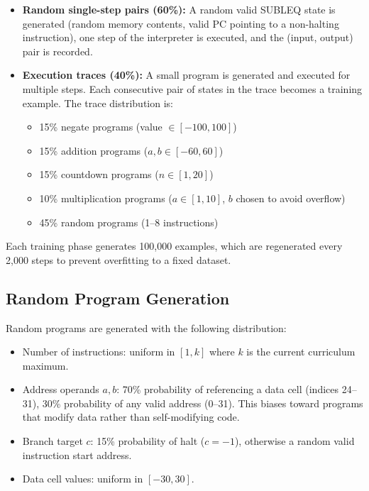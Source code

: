 \documentclass[11pt,a4paper]{article}
\begin{document}
\begin{itemize}[nosep]
  \item \textbf{Random single-step pairs (60\%):} A random valid SUBLEQ state is generated (random memory contents, valid PC pointing to a non-halting instruction), one step of the interpreter is executed, and the (input, output) pair is recorded.

  \item \textbf{Execution traces (40\%):} A small program is generated and executed for multiple steps. Each consecutive pair of states in the trace becomes a training example. The trace distribution is:
  \begin{itemize}[nosep]
    \item 15\% negate programs (value $\in [-100, 100]$)
    \item 15\% addition programs ($a, b \in [-60, 60]$)
    \item 15\% countdown programs ($n \in [1, 20]$)
    \item 10\% multiplication programs ($a \in [1, 10]$, $b$ chosen to avoid overflow)
    \item 45\% random programs (1--8 instructions)
  \end{itemize}
\end{itemize}

Each training phase generates 100{,}000 examples, which are regenerated every 2{,}000 steps to prevent overfitting to a fixed dataset.

\subsection{Random Program Generation}

Random programs are generated with the following distribution:
\begin{itemize}[nosep]
  \item Number of instructions: uniform in $[1, k]$ where $k$ is the current curriculum maximum.
  \item Address operands $a, b$: 70\% probability of referencing a data cell (indices 24--31), 30\% probability of any valid address (0--31). This biases toward programs that modify data rather than self-modifying code.
  \item Branch target $c$: 15\% probability of halt ($c = -1$), otherwise a random valid instruction start address.
  \item Data cell values: uniform in $[-30, 30]$.
\end{itemize}
\end{document}
